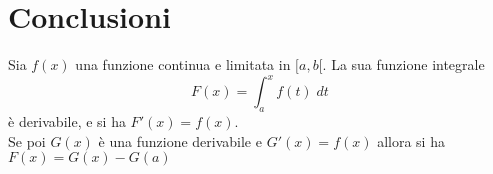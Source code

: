 \chapter*{Conclusioni}
\label{ch:conclusioni}

\begin{thm}
				Sia $f(x)$ una funzione continua e limitata in $[a,b[$. La sua funzione integrale
				$$F(x) = \int_{a}^{x}f(t)\; dt$$
				\`{e} derivabile, e si ha $F'(x) = f(x)$.\\
				Se poi $G(x)$ \`{e} una funzione derivabile e $G'(x) = f(x)$ allora si ha $F(x)=G(x)-G(a)$
\end{thm}



